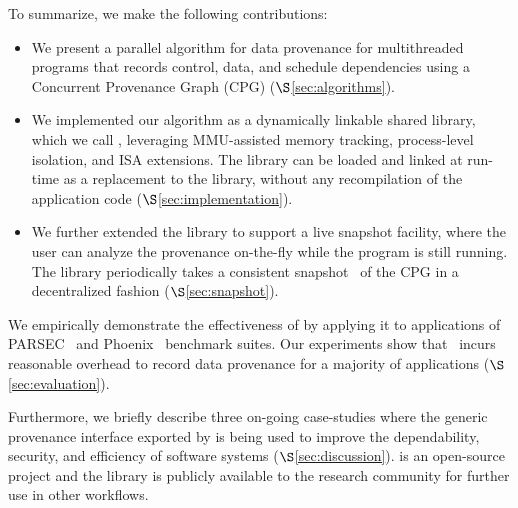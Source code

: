 To summarize, we make the following contributions:
\begin{itemize}

\item We present a parallel algorithm for data provenance for multithreaded programs that records control, data, and schedule dependencies using a Concurrent Provenance Graph (CPG) ($\S$\ref{sec:algorithms}).

\item We implemented our algorithm as a dynamically linkable shared library, which we call \projecttitle, leveraging MMU-assisted memory tracking, process-level isolation, and \intelpt ISA extensions.  The \projecttitle library can be loaded and linked at run-time as a replacement to the \pthreads library, without any recompilation  of the application code ($\S$\ref{sec:implementation}).

\item We further extended the library to support a live snapshot facility, where the user can analyze the provenance on-the-fly while the program is still running. The library periodically takes a consistent snapshot~\cite{chandy-lamport} of the CPG in a decentralized fashion ($\S$\ref{sec:snapshot}).



\end{itemize}



We  empirically demonstrate  the effectiveness of \projecttitle by applying it to applications of  PARSEC~\cite{parsec} and Phoenix~\cite{phoenix} benchmark suites. Our experiments show that \projecttitle~incurs reasonable overhead to record data provenance for a majority of applications ($\S$\ref{sec:evaluation}). 

Furthermore, we briefly describe three on-going case-studies where the generic provenance interface exported by \projecttitle is being used to improve the dependability, security, and efficiency of software systems  ($\S$\ref{sec:discussion}). \projecttitle is an open-source project and the library is publicly available to the research community for further use in other workflows.  

